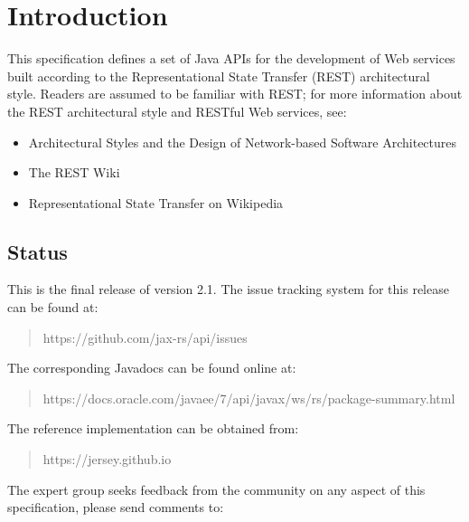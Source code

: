 \chapter{Introduction}

This specification defines a set of Java APIs for the development of Web services built according to the Representational State Transfer\cite{rest} (REST) architectural style. Readers are assumed to be familiar with 
REST; for more information about the REST architectural style and RESTful Web services, see:

\begin{itemize}
\item Architectural Styles and the Design of Network-based Software Architectures\cite{rest}
\item The REST Wiki\cite{restwiki}
\item Representational State Transfer on Wikipedia\cite{restwikipedia}
\end{itemize}

\section{Status}
\label{status}


This is the final release of version 2.1. The issue tracking system for this release can be found at:

\begin{quote}
https://github.com/jax-rs/api/issues
\end{quote}

The corresponding Javadocs can be found online at:

\begin{quote}
https://docs.oracle.com/javaee/7/api/javax/ws/rs/package-summary.html
\end{quote}

The reference implementation can be obtained from:

\begin{quote}
https://jersey.github.io
\end{quote}

The expert group seeks feedback from the community on any aspect of this specification, please send comments to:

